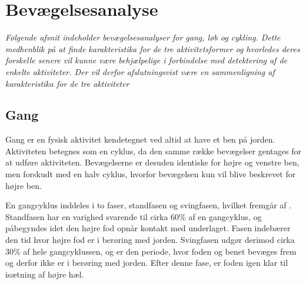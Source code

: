 \section{Bevægelsesanalyse}
%
\textit{Følgende afsnit indeholder bevægelsesanalyser for gang, løb og cykling. Dette medhenblik på at finde karakteristika for de tre aktivitetsformer og hvorledes deres forskelle senere vil kunne være behjælpelige i forbindelse med detektering af de enkelte aktiviteter. Der vil derfor afslutningsvist være en sammenligning af karakteristika for de tre aktiviteter}

\subsection{Gang}
Gang er en fysisk aktivitet kendetegnet ved altid at have et ben på jorden. Aktiviteten betegnes som en cyklus, da den samme række bevægelser gentages for at udføre aktiviteten. Bevægelserne er desuden identiske for højre og venstre ben, men forskudt med en halv cyklus, hvorfor bevægelsen kun vil blive beskrevet for højre ben. \citep{VaughanDavisOConnor1992,Whittle1990} 

En gangcyklus inddeles i to faser, standfasen og svingfasen, hvilket fremgår af . Standfasen har en varighed svarende til cirka 60\% af en gangcyklus, og påbegyndes idet den højre fod opnår kontakt med underlaget. Fasen indebærer den tid hvor højre fod er i berøring med jorden. Svingfasen udgør derimod cirka 30\% af hele gangcyklussen, og er den periode, hvor foden og benet bevæges frem og derfor ikke er i berøring med jorden. Efter denne fase, er foden igen klar til isætning af højre hæl. \citep{VaughanDavisOConnor1992}

